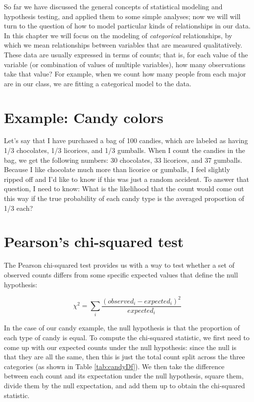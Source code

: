 \documentclass[12pt,]{book}
\theoremstyle{definition}
\theoremstyle{definition}
\theoremstyle{definition}
\theoremstyle{remark}
\begin{document}
So far we have discussed the general concepts of statistical modeling and hypothesis testing, and applied them to some simple analyses; now we will will turn to the question of how to model particular kinds of relationships in our data. In this chapter we will focus on the modeling of \emph{categorical} relationships, by which we mean relationships between variables that are measured qualitatively. These data are usually expressed in terms of counts; that is, for each value of the variable (or combination of values of multiple variables), how many observations take that value? For example, when we count how many people from each major are in our class, we are fitting a categorical model to the data.

\hypertarget{example-candy-colors}{%
\section{Example: Candy colors}\label{example-candy-colors}}

Let's say that I have purchased a bag of 100 candies, which are labeled as having 1/3 chocolates, 1/3 licorices, and 1/3 gumballs. When I count the candies in the bag, we get the following numbers: 30 chocolates, 33 licorices, and 37 gumballs. Because I like chocolate much more than licorice or gumballs, I feel slightly ripped off and I'd like to know if this was just a random accident. To answer that question, I need to know: What is the likelihood that the count would come out this way if the true probability of each candy type is the averaged proportion of 1/3 each?

\hypertarget{chi-squared-test}{%
\section{Pearson's chi-squared test}\label{chi-squared-test}}

The Pearson chi-squared test provides us with a way to test whether a set of observed counts differs from some specific expected values that define the null hypothesis:

\[
\chi^2 = \sum_i\frac{(observed_i - expected_i)^2}{expected_i}
\]

In the case of our candy example, the null hypothesis is that the proportion of each type of candy is equal. To compute the chi-squared statistic, we first need to come up with our expected counts under the null hypothesis: since the null is that they are all the same, then this is just the total count split across the three categories (as shown in Table \ref{tab:candyDf}). We then take the difference between each count and its expectation under the null hypothesis, square them, divide them by the null expectation, and add them up to obtain the chi-squared statistic.
\end{document}
